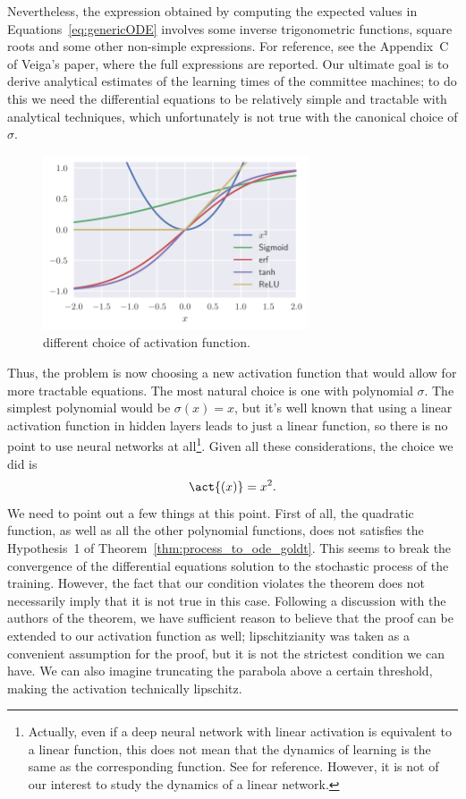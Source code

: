 Nevertheless, the expression obtained by computing the expected values in Equations~\eqref{eq:genericODE} involves
some inverse trigonometric functions, square roots and some other non-simple expressions. For reference, see
the Appendix~C of Veiga's paper\cite{veiga2022phase}, where the full expressions are reported.
Our ultimate goal is to derive analytical estimates of the learning times of the committee machines;
to do this we need the differential equations to be relatively simple and tractable with analytical techniques,
which unfortunately is not true with the canonical choice of \(\sigma\).
\begin{figure}
  \centering
  \includegraphics[width=0.7\textwidth]{figures/activation_function.pdf}
  \caption{ different choice of activation function.}
\end{figure}

Thus, the problem is now choosing a new activation function that would allow for more tractable equations.
The most natural choice is one with polynomial \(\sigma\). The simplest polynomial would be \(\sigma(x) = x\),
but it's well known that using a linear activation function in hidden layers leads to just a linear function,
so there is no point to use neural networks at all\cite{szandala2021review}\footnote{
  Actually, even if a deep neural network with linear activation is equivalent to a linear function, this does not mean that the dynamics of learning is the same as the corresponding function. See \cite{saxe2013exact} for reference. However, it is not of our interest to study the dynamics of a linear network.
}. 
Given all these considerations, the choice we did is \[\act{(x)} = x^2.\]
We need to point out a few things at this point.
First of all, the quadratic function, as well as all the other polynomial functions,
does not satisfies the Hypothesis~1 of Theorem~\ref{thm:process_to_ode_goldt}.
This seems to break the convergence of the differential equations solution to the
stochastic process of the training.
However, the fact that our condition violates the theorem does not necessarily imply that it is not true in this case. Following a discussion with the authors of the theorem, we have sufficient reason to believe that the proof can be extended to our activation function as well;
lipschitzianity was taken as a convenient assumption for the proof, but it is not the strictest condition we can have. We can also imagine truncating the parabola above a certain threshold, making the activation technically lipschitz.

